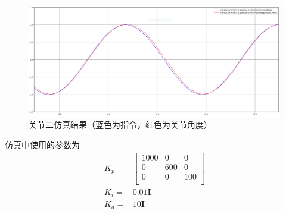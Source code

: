 \documentclass{ctexart}
\begin{document}
\begin{figure}[ht]
    \centering
    \includegraphics[width=0.8\linewidth]{figures/result-joint-2}
    \caption[关节二仿真结果]{关节二仿真结果（蓝色为指令，红色为关节角度）}
    \label{fig:simulated-result-joint-2}
\end{figure}

仿真中使用的参数为
\[
    \begin{aligned}
        K_p = & \begin{bmatrix}
            1000 & 0 & 0 \\
            0 & 600 & 0 \\
            0 & 0 & 100 \\
        \end{bmatrix} \\
        K_i = & 0.01 \mathbf I \\
        K_d = & 10 \mathbf I
    \end{aligned}
\]
\end{document}
